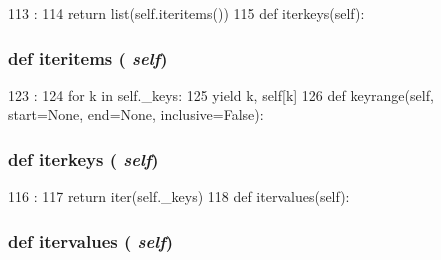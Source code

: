 \begin{DoxyCode}
113                    :
114         return list(self.iteritems())
115 
    def iterkeys(self):
\end{DoxyCode}
\hypertarget{classm5_1_1util_1_1sorteddict_1_1SortedDict_a13d39839ad1cfd4c47f524735933c0bf}{
\subsubsection[{iteritems}]{\setlength{\rightskip}{0pt plus 5cm}def iteritems ( {\em self})}}
\label{classm5_1_1util_1_1sorteddict_1_1SortedDict_a13d39839ad1cfd4c47f524735933c0bf}



\begin{DoxyCode}
123                        :
124         for k in self._keys:
125             yield k, self[k]
126 
    def keyrange(self, start=None, end=None, inclusive=False):
\end{DoxyCode}
\hypertarget{classm5_1_1util_1_1sorteddict_1_1SortedDict_a44560b0b40dfcd2069b980760783cc7b}{
\subsubsection[{iterkeys}]{\setlength{\rightskip}{0pt plus 5cm}def iterkeys ( {\em self})}}
\label{classm5_1_1util_1_1sorteddict_1_1SortedDict_a44560b0b40dfcd2069b980760783cc7b}



\begin{DoxyCode}
116                       :
117         return iter(self._keys)
118 
    def itervalues(self):
\end{DoxyCode}
\hypertarget{classm5_1_1util_1_1sorteddict_1_1SortedDict_aeb6e8630a10560ad0d4b34377c790f19}{
\subsubsection[{itervalues}]{\setlength{\rightskip}{0pt plus 5cm}def itervalues ( {\em self})}}
\label{classm5_1_1util_1_1sorteddict_1_1SortedDict_aeb6e8630a10560ad0d4b34377c790f19}



